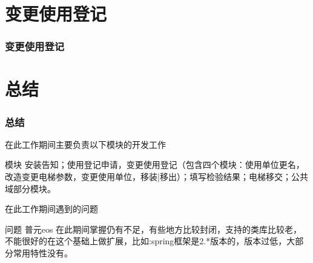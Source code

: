 \documentclass[hyperref={bookmarks=false},aspectratio=169]{beamer}
\begin{document}
\section{变更使用登记}


\begin{frame}
\frametitle{变更使用登记}

\begin{figure}[ht!]

\end{figure}

\end{frame}



\section{总结}

\begin{frame}
\frametitle{总结}

在此工作期间主要负责以下模块的开发工作

\begin{block}{模块}
安装告知；使用登记申请，变更使用登记（包含四个模块：使用单位更名，改造变更电梯参数，变更使用单位，移装|移出）；填写检验结果；电梯移交；公共域部分模块。

\end{block}

在此工作期间遇到的问题
\begin{alertblock}{问题}
普元eos 在此期间掌握仍有不足，有些地方比较封闭，支持的类库比较老，不能很好的在这个基础上做扩展，比如:spring框架是2.*版本的，版本过低，大部分常用特性没有。
\end{alertblock}

\end{frame}
\end{document}

